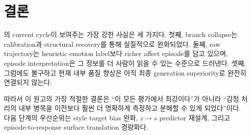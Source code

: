 \section{결론}

\EmoNet{}의 current cycle이 보여주는 가장 강한 사실은 세 가지다. 첫째, branch collapse는 calibration과 structural recovery를 통해 실질적으로 완화되었다. 둘째, raw trajectory는 heuristic emotion label보다 richer affect episode를 담고 있으며, episode interpretation은 그 정보를 더 사람이 읽을 수 있는 수준으로 드러낸다. 셋째, 그럼에도 불구하고 현재 내부 품질 향상은 아직 최종 generation superiority로 완전히 연결되지 않는다.

따라서 이 원고의 가장 적절한 결론은 ``\EmoNet{}이 모든 평가에서 최강이다''가 아니라 ``감정 처리의 내부 병목을 이전보다 훨씬 더 명확하게 측정하고 분해할 수 있게 되었다''이다. 다음 단계의 우선순위는 style target bias 완화, $z \rightarrow s$ predictor 재설계, 그리고 episode-to-response surface translation 경량화다.
